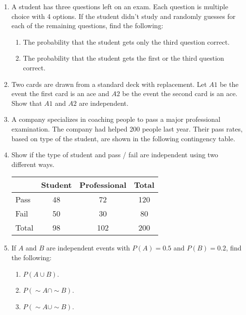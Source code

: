 \documentclass{article}
\newcommand{\comp}{{\sim}}		%
\begin{document}
\begin{enumerate}
    \item A student has three questions left on an exam. Each question is multiple choice with 4 options. If the student didn't study and randomly guesses for each of the remaining questions, find the following:
    \begin{enumerate}
        \item The probability that the student gets only the third question correct.\vspace{30pt}
        \item The probability that the student gets the first or the third question correct.
    \end{enumerate}\vspace{40pt}
    
    \item Two cards are drawn from a standard deck with replacement. Let $A1$ be the event the first card is an ace and $A2$ be the event the second card is an ace. Show that $A1$ and $A2$ are independent.\vspace{100pt}

    \item A company specializes in coaching people to pass a major professional examination. The company had helped 200 people last year. Their pass rates, based on type of the student, are shown in the following contingency table.
    \item[] Show if the type of student and pass / fail are independent using two different ways.\smallskip\\
    \begin{tabular}{| l || c | c | c |}
        \hline
         & Student & Professional & Total \\
         \hline
        Pass & 48 & 72 & 120 \\ 
        \hline
        Fail & 50 & 30 & 80  \\
        \hline\hline
        Total & 98 & 102 & 200\\
        \hline
    \end{tabular}\vspace{50pt}
    
    \item If $A$ and $B$ are independent events with $P(A) = 0.5$ and $P(B) = 0.2$, find the following: %
    \begin{enumerate}
        \item $P(A \cup B)$.\vspace{20pt}
        \item $P(\comp{A} \cap \comp{B})$.\vspace{20pt}
        \item $P(\comp{A} \cup \comp{B})$.\vspace{20pt}
    \end{enumerate}
    

\end{enumerate}
\end{document}
